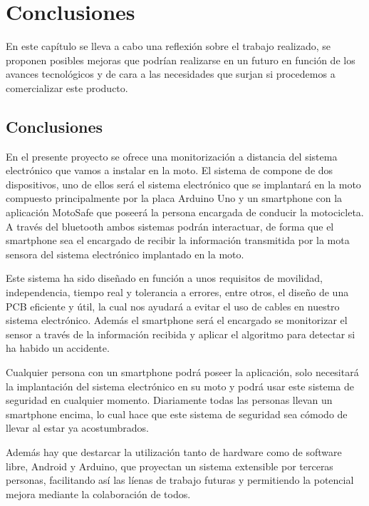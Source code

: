 	\chapter{Conclusiones}\label{cap.conclusiones}
	
	En este cap\'itulo se lleva a cabo una reflexi\'on sobre el trabajo realizado, se proponen posibles mejoras que podr\'ian realizarse en un futuro en funci\'on de los avances tecnol\'ogicos y de cara a las necesidades que surjan si procedemos a comercializar este producto.
	
	\section{Conclusiones}
	
		En el presente proyecto se ofrece una monitorizaci\'on a distancia del sistema electr\'onico que vamos a instalar en la moto. El sistema de compone de dos dispositivos, uno de ellos ser\'a el sistema electr\'onico que se implantar\'a en la moto compuesto principalmente por la placa Arduino Uno y un smartphone con la aplicaci\'on MotoSafe que poseer\'a la persona encargada de conducir la motocicleta. A través del bluetooth ambos sistemas podr\'an interactuar, de forma que el smartphone sea el encargado de recibir la informaci\'on transmitida por la mota sensora del sistema electr\'onico implantado en la moto.
		
		Este sistema ha sido dise\~nado en funci\'on a unos requisitos de movilidad, independencia, tiempo real y tolerancia a errores, entre otros, el dise\~no de una PCB eficiente y \'util, la cual nos ayudar\'a a evitar el uso de cables en nuestro sistema electr\'onico. Adem\'as el smartphone ser\'a el encargado se monitorizar el sensor a trav\'es de la informaci\'on recibida y aplicar el algoritmo para detectar si ha habido un accidente.
		
		Cualquier persona con un smartphone podr\'a poseer la aplicaci\'on, solo necesitar\'a la implantaci\'on del sistema electr\'onico en su moto y podr\'a usar este sistema de seguridad en cualquier momento. Diariamente todas las personas llevan un smartphone encima, lo cual hace que este sistema de seguridad sea c\'omodo de llevar al estar ya acostumbrados.
		
		Adem\'as hay que destarcar la utilizaci\'on tanto de hardware como de software libre, Android y Arduino, que proyectan un sistema extensible por terceras personas, facilitando as\'i las l\'ienas de trabajo futuras y permitiendo la potencial mejora mediante la colaboraci\'on de todos.
	
